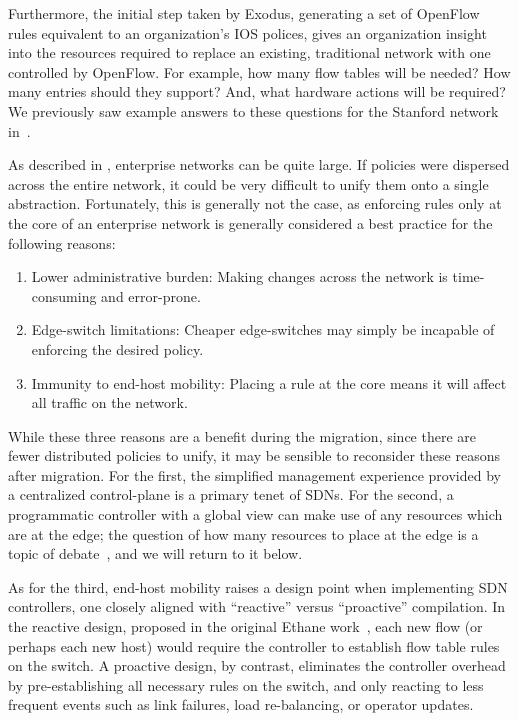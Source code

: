 Furthermore, the initial step taken by Exodus, generating a set of OpenFlow rules
equivalent to an organization's IOS polices, gives an organization insight into the
resources required to replace an existing, traditional network with one controlled by
OpenFlow. For example, how many flow tables will be needed? How many entries
should they support? And, what hardware actions will be required?
We previously saw example answers to these questions for the Stanford network in~.

As described in , enterprise networks can be quite large.  
 If policies were dispersed across the entire
network, it could be very difficult to unify them onto a single abstraction.
Fortunately, this is generally not the case, as enforcing rules only at the
core of an enterprise network is generally considered a best practice for the
following reasons:

\begin{enumerate}
\item Lower administrative burden: Making changes across the network is time-consuming and error-prone.
\item Edge-switch limitations: Cheaper edge-switches may simply be incapable of enforcing the desired policy.
\item Immunity to end-host mobility: Placing a rule at the core means it will affect all traffic on the network.
\end{enumerate}

While these three reasons are a benefit during the migration, since there are fewer
distributed policies to unify, it may be sensible to reconsider these reasons after migration.
For the first, the simplified management experience provided by a centralized control-plane
is a primary tenet of SDNs. For the second, a programmatic controller with a global
view can make use of any resources which are at the edge; the question of how many
resources to place at the edge is a topic of debate~\cite{Casado:hotsdn2012-fabric}, and we will return to it below.

As for the third, end-host mobility raises a design point when implementing SDN controllers,
one closely aligned with ``reactive'' versus ``proactive'' compilation. In the reactive design,
proposed in the original Ethane work~\cite{Casado07Ethane}, each new flow (or perhaps each new host)
would require the controller to establish flow table rules on the switch. A proactive design,
by contrast, eliminates the controller overhead by pre-establishing all necessary rules on the
switch, and only reacting to less frequent events such as link failures, load re-balancing,
or operator updates.


